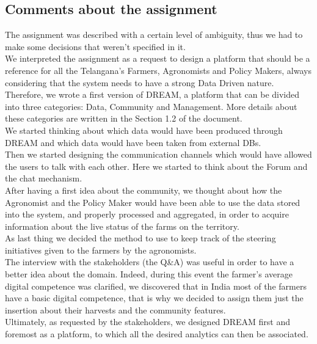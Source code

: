 \documentclass[10pt]{report}
\begin{document}
\subsection{Comments about the assignment}
The assignment was described with a certain level of ambiguity, thus we had to make some decisions that weren’t specified in it. \\We interpreted the assignment as a request to design a platform that should be a reference for all the Telangana’s Farmers, Agronomists and Policy Makers, always considering that the system needs to have a strong Data Driven nature.  \\
Therefore, we wrote a first version of DREAM, a platform that can be divided into three categories: Data, Community and Management. More details about these categories are written in the Section 1.2 of the document. \\

We started thinking about which data would have been produced through DREAM and which data would have been taken from external DBs. \\
Then we started designing the communication channels which would have allowed the users to talk with each other. Here we started to think about the Forum and the chat mechanism.\\
After having a first idea about the community, we thought about how the Agronomist and the Policy Maker would have been able to use the data stored into the system, and properly processed and aggregated, in order to acquire information about the live status of the farms on the territory. \\
As last thing we decided the method to use to keep track of the steering initiatives given to the farmers by the agronomists. \\

The interview with the stakeholders (the Q\&A) was useful in order to have a better idea about the domain. Indeed, during this event the farmer’s average digital competence was clarified, we discovered that in India most of the farmers have a basic digital competence, that is why we decided to assign them just the insertion about their harvests and the community features.\\

Ultimately, as requested by the stakeholders, we designed DREAM first and foremost as a platform, to which all the desired analytics can then be associated.\\
\end{document}
